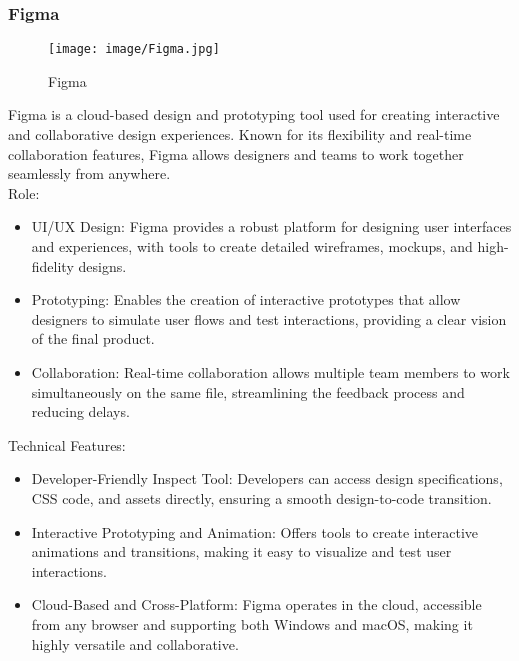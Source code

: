 \documentclass[conference]{IEEEtran}
\begin{document}
\subsubsection{Figma}

\begin{figure}[h!]
    \centering
    \texttt{[image: image/Figma.jpg]}
    \caption{Figma}
    \label{fig:enter-label}
\end{figure}

\noindent Figma is a cloud-based design and prototyping tool used for creating interactive and collaborative design experiences. Known for its flexibility and real-time collaboration features, Figma allows designers and teams to work together seamlessly from anywhere.\\

Role:
\begin{itemize}
    \item UI/UX Design: Figma provides a robust platform for designing user interfaces and experiences, with tools to create detailed wireframes, mockups, and high-fidelity designs.\\
    \item Prototyping: Enables the creation of interactive prototypes that allow designers to simulate user flows and test interactions, providing a clear vision of the final product.\\
    \item Collaboration: Real-time collaboration allows multiple team members to work simultaneously on the same file, streamlining the feedback process and reducing delays.\\
\end{itemize}

Technical Features:
\begin{itemize}
    \item Developer-Friendly Inspect Tool: Developers can access design specifications, CSS code, and assets directly, ensuring a smooth design-to-code transition.\\
    \item Interactive Prototyping and Animation: Offers tools to create interactive animations and transitions, making it easy to visualize and test user interactions.\\
    \item Cloud-Based and Cross-Platform: Figma operates in the cloud, accessible from any browser and supporting both Windows and macOS, making it highly versatile and collaborative.\\
\end{itemize}
\end{document}
